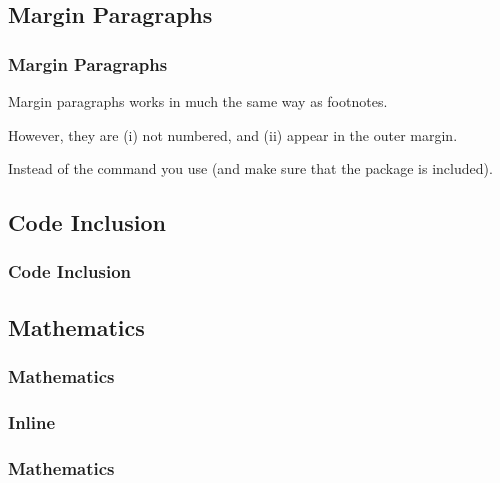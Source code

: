 {\begin{frame}[fragile]
\end{frame}

\subsection{Margin Paragraphs}
\begin{frame}[fragile]
  \frametitle{Margin Paragraphs}
  \vspace{3mm}
  Margin paragraphs works in much the same way as footnotes.
  
  \vspace{5mm}
  However, they are (i) not numbered, and (ii) appear in the outer margin.
  
  \vspace{5mm}
  Instead of the  command you use  (and make sure that the  package is included).
  
\end{frame}

\subsection{Code Inclusion}
\begin{frame}[fragile]
  \frametitle{Code Inclusion}
  \vspace{3mm}
  
\end{frame}

\subsection{Mathematics}
\begin{frame}[fragile]
  \frametitle{Mathematics}
  \vspace{3mm}
  
\end{frame}

\subsubsection{Inline}
\begin{frame}[fragile]
  \frametitle{Mathematics }
\end{frame}}
